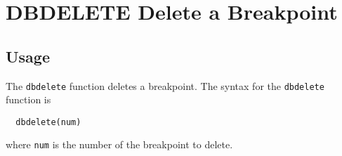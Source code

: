 \section{DBDELETE Delete a Breakpoint}

\subsection{Usage}

The \verb|dbdelete| function deletes a breakpoint.  The syntax
for the \verb|dbdelete| function is
\begin{verbatim}
  dbdelete(num)
\end{verbatim}
where \verb|num| is the number of the breakpoint to delete.
